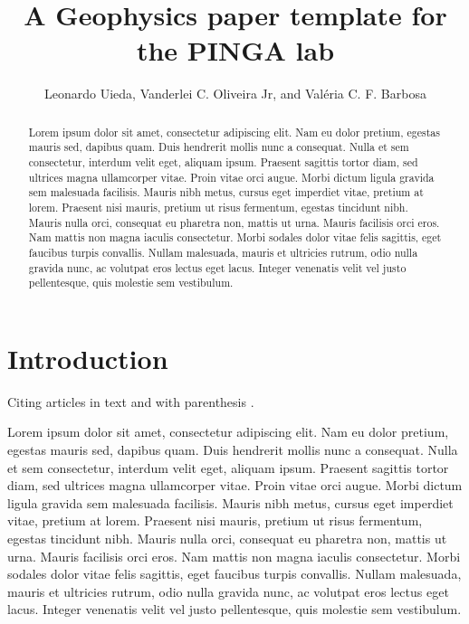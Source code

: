 \documentclass[manuscript]{geophysics}
\begin{document}
\title{A Geophysics paper template for the PINGA lab}


\address{
    \footnotemark[1]
    Universidade do Estado do Rio de Janeiro, Rio de Janeiro, Brazil,
    e-mail: \\
    \footnotemark[2]
    Observat\'orio Nacional, Rio de Janeiro, Brazil,
    e-mail:
}

\author{Leonardo Uieda\footnotemark[1]\footnotemark[2],
        Vanderlei C. Oliveira Jr\footnotemark[2],
        and
        Val\'eria C. F. Barbosa\footnotemark[2]}



\begin{abstract}
Lorem ipsum dolor sit amet, consectetur adipiscing elit. Nam eu dolor pretium,
egestas mauris sed, dapibus quam. Duis hendrerit mollis nunc a consequat. Nulla
et sem consectetur, interdum velit eget, aliquam ipsum. Praesent sagittis
tortor diam, sed ultrices magna ullamcorper vitae. Proin vitae orci augue.
Morbi dictum ligula gravida sem malesuada facilisis. Mauris nibh metus, cursus
eget imperdiet vitae, pretium at lorem. Praesent nisi mauris, pretium ut risus
fermentum, egestas tincidunt nibh. Mauris nulla orci, consequat eu pharetra
non, mattis ut urna. Mauris facilisis orci eros. Nam mattis non magna iaculis
consectetur. Morbi sodales dolor vitae felis sagittis, eget faucibus turpis
convallis. Nullam malesuada, mauris et ultricies rutrum, odio nulla gravida
nunc, ac volutpat eros lectus eget lacus. Integer venenatis velit vel justo
pellentesque, quis molestie sem vestibulum.
\end{abstract}

\section{Introduction}

Citing articles in text \citet{Asgharzadeh2007} and with parenthesis
\citep{Braitenberg2011}.

Lorem ipsum dolor sit amet, consectetur adipiscing elit. Nam eu dolor pretium,
egestas mauris sed, dapibus quam. Duis hendrerit mollis nunc a consequat. Nulla
et sem consectetur, interdum velit eget, aliquam ipsum. Praesent sagittis
tortor diam, sed ultrices magna ullamcorper vitae. Proin vitae orci augue.
Morbi dictum ligula gravida sem malesuada facilisis. Mauris nibh metus, cursus
eget imperdiet vitae, pretium at lorem. Praesent nisi mauris, pretium ut risus
fermentum, egestas tincidunt nibh. Mauris nulla orci, consequat eu pharetra
non, mattis ut urna. Mauris facilisis orci eros. Nam mattis non magna iaculis
consectetur. Morbi sodales dolor vitae felis sagittis, eget faucibus turpis
convallis. Nullam malesuada, mauris et ultricies rutrum, odio nulla gravida
nunc, ac volutpat eros lectus eget lacus. Integer venenatis velit vel justo
pellentesque, quis molestie sem vestibulum.
\end{document}
